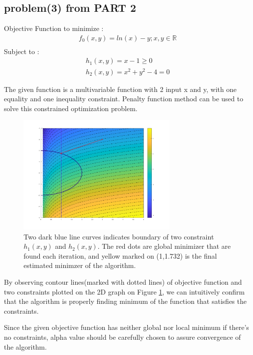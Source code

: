\documentclass[twoside,11pt]{article}
\begin{document}
\subsection*{problem(3) from PART 2}
Objective Function to minimize :
\begin{equation}
    \begin{array}{l}
    f_0(x,y)= ln(x)-y  ; x,y \in \mathbb{R} \\
    \end{array}
\end{equation}
Subject to :
\begin{equation}
    \begin{array}{l}
    h_1(x,y)=x-1 \ge 0 \\
    h_2(x,y)=x^2 +y^2 -4=0
    \end{array}
\end{equation}

The given function is a multivariable function with 2 input x and y, with one equality and one inequality constraint. Penalty function method can be used to solve this constrained optimization problem.


\begin{figure}[!h]
    \centering
    \includegraphics[width=0.7\textwidth]{figs/cst_3.png}
    \caption{Two dark blue line curves indicates boundary of two constraint $h_1(x,y)$ and $h_2(x,y)$. The red dots are global minimizer that are found each iteration, and yellow marked on (1,1.732) is the final estimated minimzer of the algorithm.}
\label{constrained problem 1}
\end{figure}

 By observing contour lines(marked with dotted lines) of objective function and two constraints plotted on the 2D graph on Figure \ref{constrained problem 1}, we can intuitively confirm that the algorithm is properly finding minimum of the function that satisfies the constraints.

Since the given objective function has neither global nor local minimum if there's no constraints, alpha value should be carefully chosen to assure convergence of the algorithm.
\end{document}
